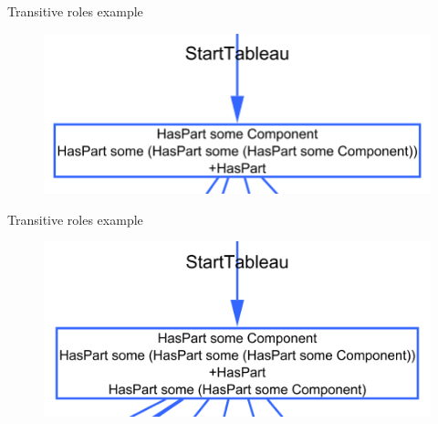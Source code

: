 \documentclass{beamer}
\begin{document}
\begin{frame}{Transitive roles example}

\begin{figure}[h]
\begin{center}
\includegraphics[scale=0.5]{premodelzondertransitivity}
\end{center}
\end{figure}

\end{frame}

\begin{frame}{Transitive roles example}

\begin{figure}[h]
\begin{center}
\includegraphics[scale=0.5]{premodelmettransitivity}
\end{center}
\end{figure}

\end{frame}
\end{document}
